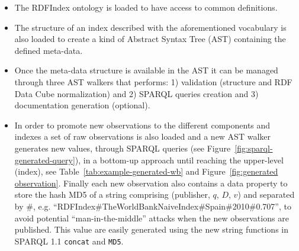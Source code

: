 \begin{itemize}
 \item The RDFIndex ontology is loaded to have access to common definitions.
 \item The structure of an index described with the aforementioned vocabulary is 
 also loaded to create a kind of Abstract Syntax Tree (AST) containing the defined meta-data.
 \item Once the meta-data structure is available in the AST it can be managed 
 through three AST walkers that performs: 1) validation (structure and RDF Data Cube normalization) 
 and 2) SPARQL queries creation and 3) documentation generation (optional). 
 \item In order to promote new observations to the different components and indexes 
 a set of raw observations is also loaded and a new AST walker generates new values, through SPARQL queries (see Figure~\ref{fig:sparql-generated-query}), 
 in a bottom-up approach until reaching the upper-level (index), see Table~\ref{tab:example-generated-wb} and Figure~\ref{fig:generated observation}. 
 Finally each new observation also contains a data property to store the hash MD5 of a string comprising 
 (publisher, $q$, $D$, $v$) and separated by \#, e.g. ``RDFIndex\#TheWorldBankNaiveIndex\#Spain\#2010\#0.707'', to avoid potential ``man-in-the-middle'' attacks when the new observations 
 are published. This value are easily generated using the new string functions in SPARQL 1.1 \texttt{concat} and \texttt{MD5}.
 \end{itemize}

% 


